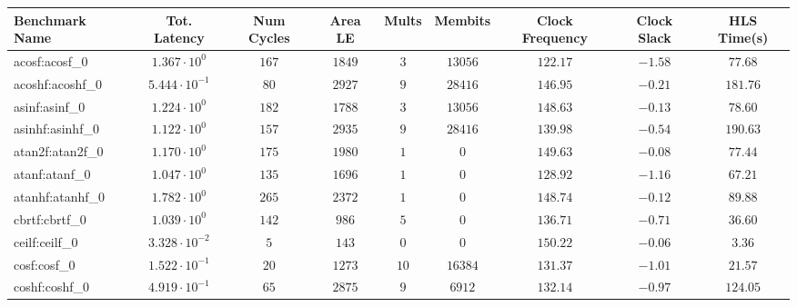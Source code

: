 \begin{tabular}{|l|c|c|c|c|c|c|c|c|}
\hline
Benchmark Name               & Tot. Latency            & Num Cycles & Area LE   & Mults   & Membits    & Clock Frequency & Clock Slack & HLS Time(s) \\
\hline
acosf:acosf\_0               & $ 1.367 \cdot 10^{0}  $ & $ 167    $ & $ 1849  $ & $ 3   $ & $ 13056  $ & $ 122.17      $ & $ -1.58   $ & $ 77.68   $ \\
acoshf:acoshf\_0             & $ 5.444 \cdot 10^{-1} $ & $ 80     $ & $ 2927  $ & $ 9   $ & $ 28416  $ & $ 146.95      $ & $ -0.21   $ & $ 181.76  $ \\
asinf:asinf\_0               & $ 1.224 \cdot 10^{0}  $ & $ 182    $ & $ 1788  $ & $ 3   $ & $ 13056  $ & $ 148.63      $ & $ -0.13   $ & $ 78.60   $ \\
asinhf:asinhf\_0             & $ 1.122 \cdot 10^{0}  $ & $ 157    $ & $ 2935  $ & $ 9   $ & $ 28416  $ & $ 139.98      $ & $ -0.54   $ & $ 190.63  $ \\
atan2f:atan2f\_0             & $ 1.170 \cdot 10^{0}  $ & $ 175    $ & $ 1980  $ & $ 1   $ & $ 0      $ & $ 149.63      $ & $ -0.08   $ & $ 77.44   $ \\
atanf:atanf\_0               & $ 1.047 \cdot 10^{0}  $ & $ 135    $ & $ 1696  $ & $ 1   $ & $ 0      $ & $ 128.92      $ & $ -1.16   $ & $ 67.21   $ \\
atanhf:atanhf\_0             & $ 1.782 \cdot 10^{0}  $ & $ 265    $ & $ 2372  $ & $ 1   $ & $ 0      $ & $ 148.74      $ & $ -0.12   $ & $ 89.88   $ \\
cbrtf:cbrtf\_0               & $ 1.039 \cdot 10^{0}  $ & $ 142    $ & $ 986   $ & $ 5   $ & $ 0      $ & $ 136.71      $ & $ -0.71   $ & $ 36.60   $ \\
ceilf:ceilf\_0               & $ 3.328 \cdot 10^{-2} $ & $ 5      $ & $ 143   $ & $ 0   $ & $ 0      $ & $ 150.22      $ & $ -0.06   $ & $ 3.36    $ \\
cosf:cosf\_0                 & $ 1.522 \cdot 10^{-1} $ & $ 20     $ & $ 1273  $ & $ 10  $ & $ 16384  $ & $ 131.37      $ & $ -1.01   $ & $ 21.57   $ \\
coshf:coshf\_0               & $ 4.919 \cdot 10^{-1} $ & $ 65     $ & $ 2875  $ & $ 9   $ & $ 6912   $ & $ 132.14      $ & $ -0.97   $ & $ 124.05  $ \\

\end{tabular}
